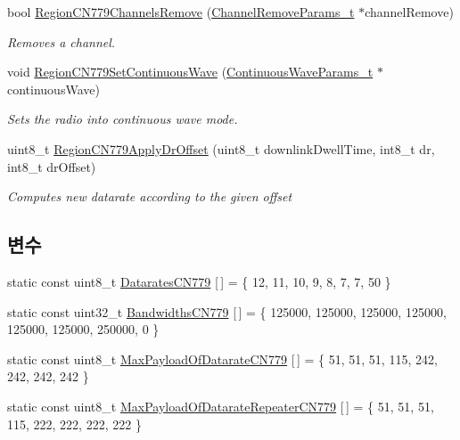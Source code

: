 \begin{DoxyCompactItemize}
bool \mbox{\hyperlink{group___r_e_g_i_o_n_c_n779_ga3ea3d4f5fe7cb25f562f4e6f95396eed}{Region\+C\+N779\+Channels\+Remove}} (\mbox{\hyperlink{group___r_e_g_i_o_n_gaa37468560d2fc81a977b57a48e5d72c0}{Channel\+Remove\+Params\+\_\+t}} $\ast$channel\+Remove)
\begin{DoxyCompactList}\small\item\em Removes a channel. \end{DoxyCompactList}\item 
void \mbox{\hyperlink{group___r_e_g_i_o_n_c_n779_ga702d0d0348fdbcb2b66f7e9d5fb93a61}{Region\+C\+N779\+Set\+Continuous\+Wave}} (\mbox{\hyperlink{group___r_e_g_i_o_n_gaf39bb5ba06921139c6d17f88a8d518cd}{Continuous\+Wave\+Params\+\_\+t}} $\ast$continuous\+Wave)
\begin{DoxyCompactList}\small\item\em Sets the radio into continuous wave mode. \end{DoxyCompactList}\item 
uint8\+\_\+t \mbox{\hyperlink{group___r_e_g_i_o_n_c_n779_gab03fbee2e88e81b71c04f907af8b283e}{Region\+C\+N779\+Apply\+Dr\+Offset}} (uint8\+\_\+t downlink\+Dwell\+Time, int8\+\_\+t dr, int8\+\_\+t dr\+Offset)
\begin{DoxyCompactList}\small\item\em Computes new datarate according to the given offset \end{DoxyCompactList}\end{DoxyCompactItemize}
\subsection*{변수}
\begin{DoxyCompactItemize}
\item 
static const uint8\+\_\+t \mbox{\hyperlink{group___r_e_g_i_o_n_c_n779_ga3afe3fa6719843ac5da4a1e8e758dc8b}{Datarates\+C\+N779}} \mbox{[}$\,$\mbox{]} = \{ 12, 11, 10, 9, 8, 7, 7, 50 \}
\item 
static const uint32\+\_\+t \mbox{\hyperlink{group___r_e_g_i_o_n_c_n779_gab4eef3dc42cf12e2e9fcb552cc5b137b}{Bandwidths\+C\+N779}} \mbox{[}$\,$\mbox{]} = \{ 125000, 125000, 125000, 125000, 125000, 125000, 250000, 0 \}
\item 
static const uint8\+\_\+t \mbox{\hyperlink{group___r_e_g_i_o_n_c_n779_ga3fd6e224742f7f2aa66b659d25b71e53}{Max\+Payload\+Of\+Datarate\+C\+N779}} \mbox{[}$\,$\mbox{]} = \{ 51, 51, 51, 115, 242, 242, 242, 242 \}
\item 
static const uint8\+\_\+t \mbox{\hyperlink{group___r_e_g_i_o_n_c_n779_ga8ccff08913b601d267589caf346a585b}{Max\+Payload\+Of\+Datarate\+Repeater\+C\+N779}} \mbox{[}$\,$\mbox{]} = \{ 51, 51, 51, 115, 222, 222, 222, 222 \}
\end{DoxyCompactItemize}


